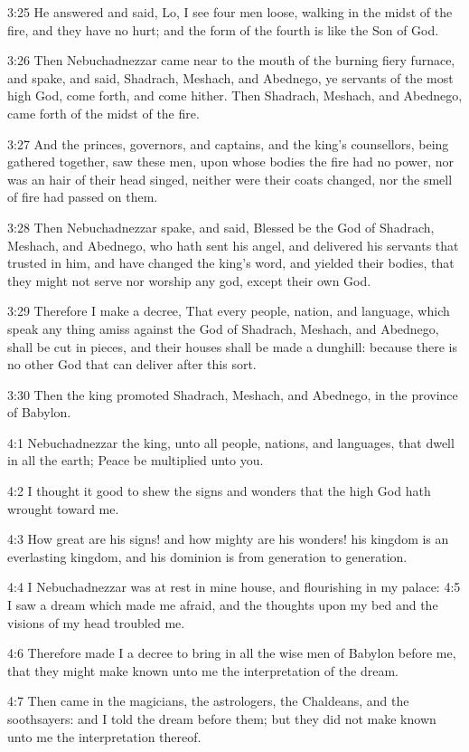 3:25 He answered and said, Lo, I see four men loose, walking in the
midst of the fire, and they have no hurt; and the form of the fourth
is like the Son of God.

3:26 Then Nebuchadnezzar came near to the mouth of the burning fiery
furnace, and spake, and said, Shadrach, Meshach, and Abednego, ye
servants of the most high God, come forth, and come hither. Then
Shadrach, Meshach, and Abednego, came forth of the midst of the fire.

3:27 And the princes, governors, and captains, and the king's
counsellors, being gathered together, saw these men, upon whose bodies
the fire had no power, nor was an hair of their head singed, neither
were their coats changed, nor the smell of fire had passed on them.

3:28 Then Nebuchadnezzar spake, and said, Blessed be the God of
Shadrach, Meshach, and Abednego, who hath sent his angel, and
delivered his servants that trusted in him, and have changed the
king's word, and yielded their bodies, that they might not serve nor
worship any god, except their own God.

3:29 Therefore I make a decree, That every people, nation, and
language, which speak any thing amiss against the God of Shadrach,
Meshach, and Abednego, shall be cut in pieces, and their houses shall
be made a dunghill: because there is no other God that can deliver
after this sort.

3:30 Then the king promoted Shadrach, Meshach, and Abednego, in the
province of Babylon.

4:1 Nebuchadnezzar the king, unto all people, nations, and languages,
that dwell in all the earth; Peace be multiplied unto you.

4:2 I thought it good to shew the signs and wonders that the high God
hath wrought toward me.

4:3 How great are his signs! and how mighty are his wonders! his
kingdom is an everlasting kingdom, and his dominion is from generation
to generation.

4:4 I Nebuchadnezzar was at rest in mine house, and flourishing in my
palace: 4:5 I saw a dream which made me afraid, and the thoughts upon
my bed and the visions of my head troubled me.

4:6 Therefore made I a decree to bring in all the wise men of Babylon
before me, that they might make known unto me the interpretation of
the dream.

4:7 Then came in the magicians, the astrologers, the Chaldeans, and
the soothsayers: and I told the dream before them; but they did not
make known unto me the interpretation thereof.

